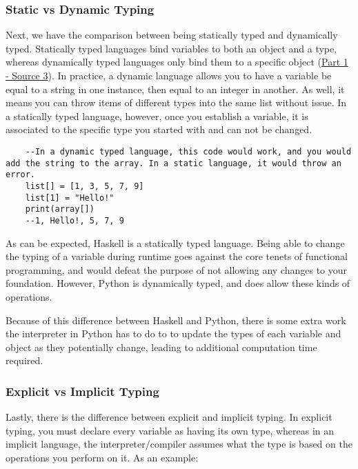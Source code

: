 \documentclass{article}
\begin{document}
    \subsubsection{Static vs Dynamic Typing}
    \medskip\noindent Next, we have the comparison between being statically typed and dynamically typed. Statically typed languages bind variables to both an object and a type, whereas dynamically typed languages only bind them to a specific object (\href{https://pythonconquerstheuniverse.wordpress.com/2009/10/03/static-vs-dynamic-typing-of-programming-languages/} {Part 1 - Source 3}). In practice, a dynamic language allows you to have a variable be equal to a string in one instance, then equal to an integer in another. As well, it means you can throw items of different types into the same list without issue. In a statically typed language, however, once you establish a variable, it is associated to the specific type you started with and can not be changed. 
    
       \begin{lstlisting}
    --In a dynamic typed language, this code would work, and you would add the string to the array. In a static language, it would throw an error. 
    list[] = [1, 3, 5, 7, 9]
    list[1] = "Hello!"
    print(array[])
    --1, Hello!, 5, 7, 9
    \end{lstlisting}
    
    \medskip\noindent As can be expected, Haskell is a statically typed language. Being able to change the typing of a variable during runtime goes against the core tenets of functional programming, and would defeat the purpose of not allowing any changes to your foundation. However, Python is dynamically typed, and does allow these kinds of operations. 
    
    \medskip\noindent Because of this difference between Haskell and Python, there is some extra work the interpreter in Python has to do to to update the types of each variable and object as they potentially change, leading to additional computation time required. 
    
    \subsubsection{Explicit vs Implicit Typing}
    Lastly, there is the difference between explicit and implicit typing. In explicit typing, you must declare every variable as having its own type, whereas in an implicit language, the interpreter/compiler assumes what the type is based on the operations you perform on it. As an example: 
    
\end{document}
